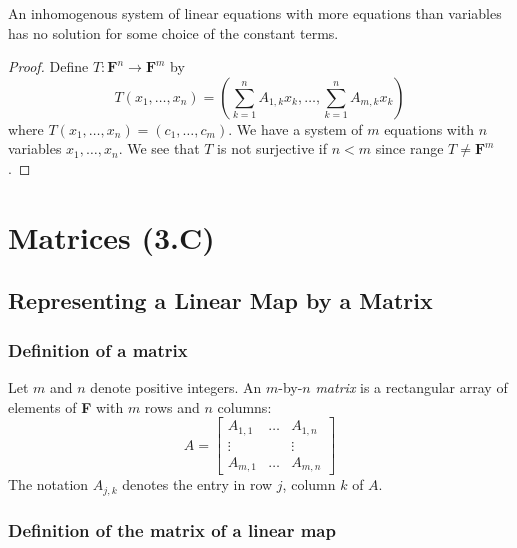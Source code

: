 \documentclass[11pt]{article}
\begin{document}
    An inhomogenous system of linear equations with more equations than variables has no solution for some choice of the constant terms.

    \begin{proof}
        Define \(T: \textbf{F}^n \rightarrow \textbf{F}^m\) by \[T(x_1, \dots, x_n) = \left( \sum_{k=1}^{n} A_{1,k} x_k, \dots, \sum_{k=1}^{n} A_{m,k} x_k \right)\] where \(T(x_1, \dots, x_n) = (c_1, \dots, c_m)\). We have a system of $m$ equations with $n$ variables \(x_1, \dots, x_n\). We see that $T$ is not surjective if \(n < m\) since range \(T \neq \textbf{F}^m\).
    \end{proof}

    \pagebreak

    \section{Matrices (3.C)}

    \subsection{Representing a Linear Map by a Matrix}

    \subsubsection{Definition of a matrix}

    Let $m$ and $n$ denote positive integers. An $m$-by-$n$ \emph{matrix} is a rectangular array of elements of \textbf{F} with $m$ rows and $n$ columns:
    \begin{equation*}
        A = \begin{bmatrix}
                A_{1,1} & \dots & A_{1,n} \\
                \vdots  &       &  \vdots \\
                A_{m,1} & \dots &  A_{m,n}
            \end{bmatrix}
    \end{equation*}
    The notation \(A_{j,k}\) denotes the entry in row $j$, column $k$ of $A$.

    \subsubsection{Definition of the matrix of a linear map}
\end{document}
